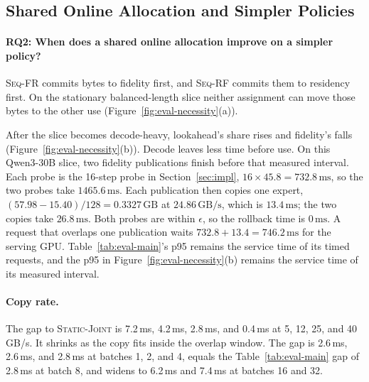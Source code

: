 \subsection{Shared Online Allocation and Simpler Policies}
\label{sec:eval-necessity}

\paragraph{RQ2: When does a shared online allocation improve on a simpler policy?}
\textsc{Seq-FR} commits bytes to fidelity first, and \textsc{Seq-RF} commits them to residency first. On the stationary balanced-length slice neither assignment can move those bytes to the other use (Figure~\ref{fig:eval-necessity}(a)).

After the slice becomes decode-heavy, lookahead's share rises and fidelity's falls (Figure~\ref{fig:eval-necessity}(b)). Decode leaves less time before use. On this Qwen3-30B slice, two fidelity publications finish before that measured interval. Each probe is the 16-step probe in Section~\ref{sec:impl}, \(16\times 45.8=732.8\,\mathrm{ms}\), so the two probes take \(1465.6\,\mathrm{ms}\). Each publication then copies one expert, \((57.98-15.40)/128=0.3327\,\mathrm{GB}\) at \(24.86\,\mathrm{GB/s}\), which is \(13.4\,\mathrm{ms}\); the two copies take \(26.8\,\mathrm{ms}\). Both probes are within \(\epsilon\), so the rollback time is \(0\,\mathrm{ms}\). A request that overlaps one publication waits \(732.8+13.4=746.2\,\mathrm{ms}\) for the serving GPU. Table~\ref{tab:eval-main}'s p95 remains the service time of its timed requests, and the p95 in Figure~\ref{fig:eval-necessity}(b) remains the service time of its measured interval.

\paragraph{Copy rate.}
\label{sec:eval-robustness}
The gap to \textsc{Static-Joint} is 7.2\,ms, 4.2\,ms, 2.8\,ms, and 0.4\,ms at 5, 12, 25, and 40\,GB/s. It shrinks as the copy fits inside the overlap window. The gap is 2.6\,ms, 2.6\,ms, and 2.8\,ms at batches 1, 2, and 4, equals the Table~\ref{tab:eval-main} gap of 2.8\,ms at batch 8, and widens to 6.2\,ms and 7.4\,ms at batches 16 and 32.

